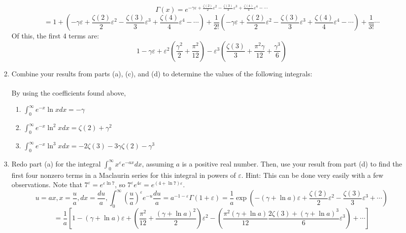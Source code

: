 \documentclass{article}
\begin{document}
\begin{enumerate}
\begin{enumerate}
        \[\Gamma(x) = e^{-\gamma \varepsilon + \frac{\zeta(2)}{2}\varepsilon^2 - \frac{\zeta(3)}{3}\varepsilon^3 + \frac{\zeta(4)}{4}\varepsilon^4 - \cdots} \]\[= 1 + (-\gamma \varepsilon + \frac{\zeta(2)}{2}\varepsilon^2 - \frac{\zeta(3)}{3}\varepsilon^3 + \frac{\zeta(4)}{4}\varepsilon^4 - \cdots) + \frac 1 {2!} (-\gamma \varepsilon + \frac{\zeta(2)}{2}\varepsilon^2 - \frac{\zeta(3)}{3}\varepsilon^3 + \frac{\zeta(4)}{4}\varepsilon^4 - \cdots) + \frac 1{3!} \cdots\]
        Of this, the first 4 terms are:
        \[\boxed{1 - \gamma \varepsilon + \varepsilon^2\left( \frac{\gamma^2}{2} + \frac{\pi^2}{12} \right) - \varepsilon^3\left(\frac{\zeta(3)}{3} + \frac{\pi^2 \gamma}{12} + \frac{\gamma^3}{6}\right)}\]
        \item Combine your results from parts (a), (c), and (d) to determine the values of the following integrals:
        \\\\ By using the coefficients found above,
        \begin{enumerate}
            \item $\int_{0}^{\infty} e^{-x}\ln xdx = \boxed{-\gamma}$
            \item $\int_{0}^{\infty} e^{-x}\ln^2 xdx = \boxed{\zeta(2) + \gamma^2}$
            \item $\int_{0}^{\infty}e^{-x}\ln^3 xdx = \boxed{-2\zeta(3) -3\gamma\zeta(2) - \gamma^3}$
        \end{enumerate}
        \item Redo part (a) for the integral $\int_{0}^{\infty}x^\varepsilon e^{-ax}dx$, assuming $a$ is a positive real number. Then, use your result from part (d) to find the first four nonzero terms in a Maclaurin series for this integral in powers of $\varepsilon$. Hint: This can be done very easily with a few observations. Note that $7^{\varepsilon} = e^{\varepsilon\ln 7}$, so $7^{\varepsilon}e^{4\varepsilon} = e^{(4+\ln7)\varepsilon}$.
        \\ 
        \[u = ax, x = \frac u a, dx = \frac{du}{a}, \int_{0}^{\infty} \left(\frac u a\right)^{\varepsilon}e^{-u}\frac{du}{a} = a^{-1-\varepsilon} \Gamma(1+\varepsilon) = \frac 1 a \exp(-(\gamma + \ln a)\varepsilon + \frac{\zeta(2)}{2}\varepsilon^2 - \frac{\zeta(3)}{3}\varepsilon^3 + \cdots)\]
        \[ = \boxed{\frac{1}{a}\left[ 1 - (\gamma + \ln a)\varepsilon + \left(\frac{\pi^2}{12}+\frac{(\gamma+\ln a)^2}{2}\right)\varepsilon^2 - \left(\frac{\pi^2(\gamma + \ln a)}{12}\frac{2\zeta(3) +(\gamma + \ln a)^3}{6}\varepsilon^3\right) + \cdots\right]}\]

\end{enumerate}
\end{enumerate}
\end{document}
